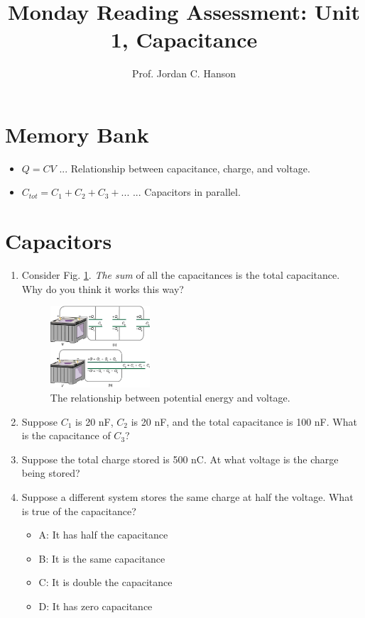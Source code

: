 \documentclass{article}
\begin{document}
\title{Monday Reading Assessment: Unit 1, Capacitance}
\author{Prof. Jordan C. Hanson}

\maketitle

\section{Memory Bank}

\begin{itemize}
\item $Q = CV$ ... Relationship between capacitance, charge, and voltage.
\item $C_{tot} = C_1 + C_2 + C_3 + ...$ ... Capacitors in parallel.
\end{itemize}

\section{Capacitors}

\begin{enumerate}
\item Consider Fig. \ref{fig:plates}.  \textit{The sum} of all the capacitances is the total capacitance.  Why do you think it works this way? \\ \vspace{1.5cm}
\begin{figure}[ht]
\centering
\includegraphics[width=0.35\textwidth]{cap1.jpeg}
\caption{\label{fig:plates} The relationship between potential energy and voltage.}
\end{figure}
\item Suppose $C_1$ is 20 nF, $C_2$ is 20 nF, and the total capacitance is 100 nF.  What is the capacitance of $C_3$? \\ \vspace{1cm}
\item Suppose the total charge stored is 500 nC.  At what voltage is the charge being stored? \\ \vspace{1cm}
\item Suppose a different system stores the same charge at half the voltage.  What is true of the capacitance?
\begin{itemize}
\item A: It has half the capacitance
\item B: It is the same capacitance
\item C: It is double the capacitance
\item D: It has zero capacitance
\end{itemize}
\end{enumerate}
\end{document}
